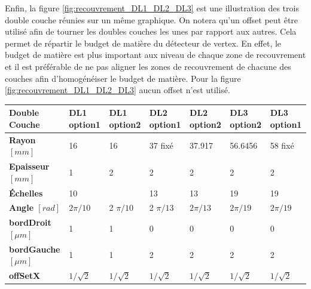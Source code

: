  \medskip
 
  Enfin, la figure \ref{fig:recouvrement_DL1_DL2_DL3} est une illustration des trois double couche r\'eunies sur un m\^eme graphique. On notera qu'un offset peut \^etre utilis\'e afin de tourner les doubles couches les unes par rapport aux autres. Cela permet de r\'epartir le budget de mati\`ere du d\'etecteur de vertex. En effet, le budget de mati\`ere est plus important aux niveau de chaque zone de recouvrement et il est pr\'ef\'erable de ne pas aligner les zones de recouvrement de chacune des couches afin d'homog\'en\'eiser le budget de mati\`ere. Pour la figure \ref{fig:recouvrement_DL1_DL2_DL3} aucun offset n'est utilis\'e.
  
\begin{table}
\begin{tabular}{|l|l|l|l|l|l|l|} \hline
\textbf{Double Couche}            & \textbf{DL1 option1} & \textbf{DL1 option2} & \textbf{DL2 option1} & \textbf{DL2 option2} & \textbf{DL3 option2} & \textbf{DL3 option1} \\ \hline
\textbf{Rayon $[mm]$}           & 16                   & 16                   & 37 fix\'e               & 37.917               & 56.6456              & 58 fix\'e               \\ \hline
\textbf{Epaisseur $[mm]$}       & 1                    & 2                    & 2                    & 2                    & 2                    & 2                    \\ \hline
\textbf{\'Echelles}                  & 10                   &                      & 13                   & 13                   & 19                   & 19                   \\ \hline
\textbf{Angle $[rad]$}          & $2 \pi / 10$           & 2 $\pi / 10$           & 2 $\pi /13$            & $2 \pi /13$            & $2 \pi/ 19$            & $2 \pi/ 19$            \\
\textbf{bordDroit $[\mu m]$}    & 1                    & 1                    & 0                    & 0                    & 0                    & 0                    \\ \hline
\textbf{bordGauche $[\mu m]$}   & 1                    & 1                    & 2                    & 2                    & 2                    & 2                    \\ \hline
\textbf{offSetX}                  & $1/\sqrt{2}$          & $1/\sqrt{2}$          & $1/\sqrt{2}$          & $1/\sqrt{2}$          & $1/\sqrt{2}$          & $1/\sqrt{2}$          \\ \hline

\end{tabular}
\end{table}
